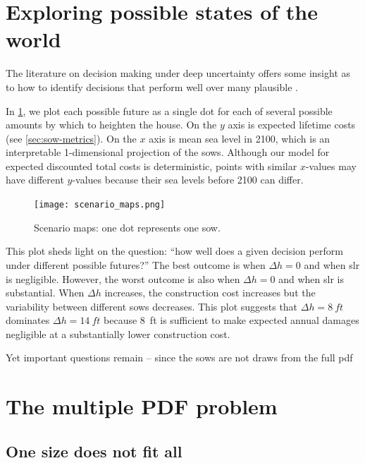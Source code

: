 \documentclass[12pt]{article}
\begin{document}
\section{Exploring possible states of the world}\label{sec:multiple-simulation}

The literature on decision making under deep uncertainty \citep[see][]{marchau:2019} offers some insight as to how to identify decisions that perform well over many plausible .

In \cref{fig:scenario-map}, we plot each possible future as a single dot for each of several possible amounts by which to heighten the house.
On the $y$ axis is expected lifetime costs (see \cref{sec:sow-metrics}).
On the $x$ axis is mean sea level in 2100, which is an interpretable 1-dimensional projection of the \glspl{sow}.
Although our model for expected discounted total costs is deterministic, points with similar $x$-values may have different $y$-values because their sea levels before 2100 can differ.

\begin{figure}
    \texttt{[image: scenario\_maps.png]}
    \caption{
        Scenario maps: one dot represents one \gls{sow}.
    }\label{fig:scenario-map}
\end{figure}

This plot sheds light on the question: ``how well does a given decision perform under different possible futures?''
The best outcome is when $\Delta h = 0$ and when \gls{slr} is negligible.
However, the worst outcome is also when $\Delta h = 0$ and when \gls{slr} is substantial.
When $\Delta h$ increases, the construction cost increases but the variability between different \glspl{sow} decreases.
This plot suggests that $\Delta h = \SI{8}{ft}$ dominates $\Delta h = \SI{14}{ft}$ because \SI{8}{ft} is sufficient to make expected annual damages negligible at a substantially lower construction cost.

Yet important questions remain -- since the \glspl{sow} are not draws from the full \gls{pdf}

\section{The multiple PDF problem}\label{sec:multiple-pdf}

\subsection{One size does not fit all}
\end{document}
